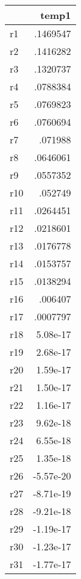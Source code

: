 \begin{tabular}{lr}
\hline\hline
            &       temp1\\
\hline
r1          &    .1469547\\
r2          &    .1416282\\
r3          &    .1320737\\
r4          &    .0788384\\
r5          &    .0769823\\
r6          &    .0760694\\
r7          &     .071988\\
r8          &    .0646061\\
r9          &    .0557352\\
r10         &     .052749\\
r11         &    .0264451\\
r12         &    .0218601\\
r13         &    .0176778\\
r14         &    .0153757\\
r15         &    .0138294\\
r16         &     .006407\\
r17         &    .0007797\\
r18         &    5.08e-17\\
r19         &    2.68e-17\\
r20         &    1.59e-17\\
r21         &    1.50e-17\\
r22         &    1.16e-17\\
r23         &    9.62e-18\\
r24         &    6.55e-18\\
r25         &    1.35e-18\\
r26         &   -5.57e-20\\
r27         &   -8.71e-19\\
r28         &   -9.21e-18\\
r29         &   -1.19e-17\\
r30         &   -1.23e-17\\
r31         &   -1.77e-17\\
\hline\hline
\end{tabular}
